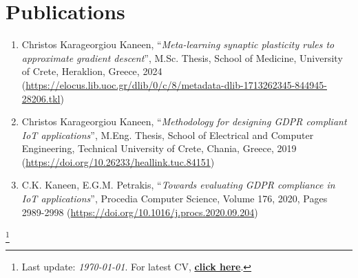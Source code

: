 \documentclass[letterpaper,11pt]{article}
\newcommand\blfootnote[1]{%
  \begingroup
  \renewcommand\thefootnote{}\footnote{#1}%
  \addtocounter{footnote}{-1}%
  \endgroup
}
\begin{document}
\section{Publications}
\begin{enumerate}
\item Christos Karageorgiou Kaneen, ``\textit{Meta-learning synaptic plasticity rules to approximate gradient descent}'', M.Sc. Thesis, School of Medicine, University of Crete, Heraklion, Greece, 2024 (\url{https://elocus.lib.uoc.gr/dlib/0/c/8/metadata-dlib-1713262345-844945-28206.tkl})
\item Christos Karageorgiou Kaneen, ``\textit{Methodology for designing GDPR compliant IoT applications}'', M.Eng. Thesis, School of Electrical and Computer Engineering, Technical University of Crete, Chania, Greece, 2019 (\url{https://doi.org/10.26233/heallink.tuc.84151})
\item C.K. Kaneen, E.G.M. Petrakis, ``\textit{Towards evaluating GDPR compliance in IoT applications}'', Procedia Computer Science, Volume 176, 2020, Pages 2989-2998 (\url{https://doi.org/10.1016/j.procs.2020.09.204})
\end{enumerate}

\blfootnote{\large{Last update: \textit{\today}. For latest CV, \href{https://raw.githubusercontent.com/ckarageorgkaneen/cv/master/cv.pdf}{\textbf{click here}}.}}
\end{document}
